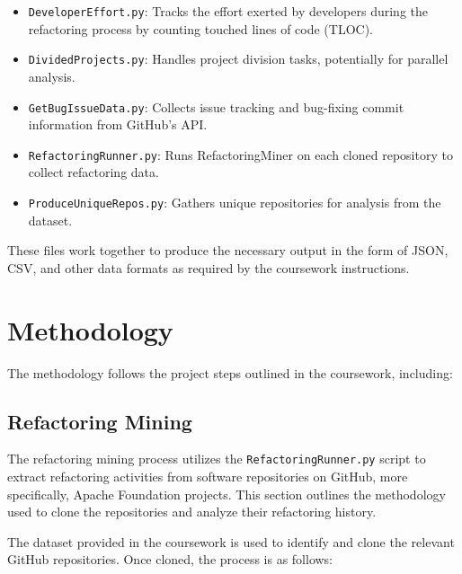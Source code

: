 \documentclass[sigconf]{acmart}
\begin{document}
\begin{itemize}
  \item \texttt{DeveloperEffort.py}: Tracks the effort exerted by developers during the refactoring process by counting touched lines of code (TLOC).
  \item \texttt{DividedProjects.py}: Handles project division tasks, potentially for parallel analysis.
  \item \texttt{GetBugIssueData.py}: Collects issue tracking and bug-fixing commit information from GitHub's API.
  \item \texttt{RefactoringRunner.py}: Runs RefactoringMiner on each cloned repository to collect refactoring data.
  \item \texttt{ProduceUniqueRepos.py}: Gathers unique repositories for analysis from the dataset.
\end{itemize}

These files work together to produce the necessary output in the form of JSON, CSV, and other data formats as required by the coursework instructions.

\section{Methodology}
The methodology follows the project steps outlined in the coursework, including:

\subsection{Refactoring Mining}
The refactoring mining process utilizes the \texttt{RefactoringRunner.py} script to extract refactoring activities from software repositories on GitHub, more specifically, Apache Foundation projects. This section outlines the methodology used to clone the repositories and analyze their refactoring history.

The dataset provided in the coursework is used to identify and clone the relevant GitHub repositories. Once cloned, the process is as follows:
\end{document}
